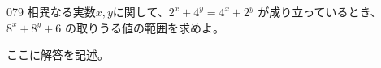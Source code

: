 \begin{thm}{079}{}{}
 相異なる実数$x, y$に関して、$2^x+4^y=4^x+2^y$ が成り立っているとき、$8^x+8^y+6$ の取りうる値の範囲を求めよ。
\end{thm}

ここに解答を記述。